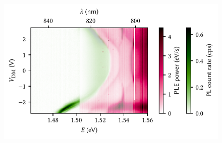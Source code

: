 \begin{figure}
    \centering
    \includegraphics{img/pdf/experiment/doped_M1_05_49-2_ple_single}
    \caption[
        ,
        .
        \protect\newline
    ]{
    }
    \label{fig:app:exp:pl:doped_M1_05_49-2_ple}
\end{figure}
